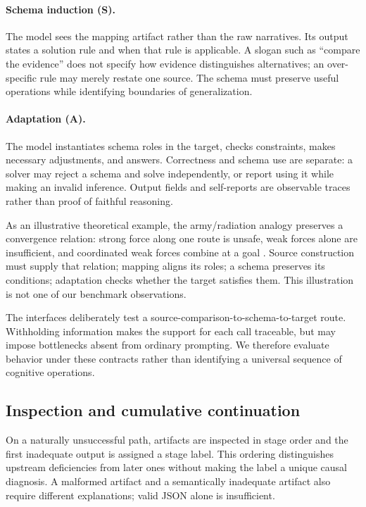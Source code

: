 \paragraph{Schema induction (S).}
The model sees the mapping artifact rather than the raw narratives. Its output states a solution rule and when that rule is applicable. A slogan such as ``compare the evidence'' does not specify how evidence distinguishes alternatives; an over-specific rule may merely restate one source. The schema must preserve useful operations while identifying boundaries of generalization.

\paragraph{Adaptation (A).}
The model instantiates schema roles in the target, checks constraints, makes necessary adjustments, and answers. Correctness and schema use are separate: a solver may reject a schema and solve independently, or report using it while making an invalid inference. Output fields and self-reports are observable traces rather than proof of faithful reasoning.

As an illustrative theoretical example, the army/radiation analogy preserves a convergence relation: strong force along one route is unsafe, weak forces alone are insufficient, and coordinated weak forces combine at a goal \citep{gick1980analogical}. Source construction must supply that relation; mapping aligns its roles; a schema preserves its conditions; adaptation checks whether the target satisfies them. This illustration is not one of our benchmark observations.

The interfaces deliberately test a source-comparison-to-schema-to-target route. Withholding information makes the support for each call traceable, but may impose bottlenecks absent from ordinary prompting. We therefore evaluate behavior under these contracts rather than identifying a universal sequence of cognitive operations.

\subsection{Inspection and cumulative continuation}
\label{sec:repair}
On a naturally unsuccessful path, artifacts are inspected in stage order and the first inadequate output is assigned a stage label. This ordering distinguishes upstream deficiencies from later ones without making the label a unique causal diagnosis. A malformed artifact and a semantically inadequate artifact also require different explanations; valid JSON alone is insufficient.

